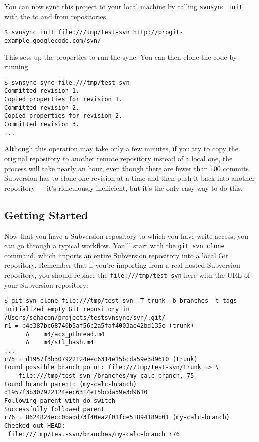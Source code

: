 \documentclass[a4paper]{book}
\begin{document}
You can now sync this project to your local machine by calling \texttt{svnsync init} with the to and from repositories.

\begin{shaded}\begin{verbatim}
$ svnsync init file:///tmp/test-svn http://progit-example.googlecode.com/svn/
\end{verbatim}\end{shaded}

This sets up the properties to run the sync. You can then clone the code by running

\begin{shaded}\begin{verbatim}
$ svnsync sync file:///tmp/test-svn
Committed revision 1.
Copied properties for revision 1.
Committed revision 2.
Copied properties for revision 2.
Committed revision 3.
...
\end{verbatim}\end{shaded}

Although this operation may take only a few minutes, if you try to copy the original repository to another remote repository instead of a local one, the process will take nearly an hour, even though there are fewer than 100 commits. Subversion has to clone one revision at a time and then push it back into another repository --- it's ridiculously inefficient, but it's the only easy way to do this.

\subsection{Getting Started}\label{getting-started-1}

Now that you have a Subversion repository to which you have write access, you can go through a typical workflow. You'll start with the \texttt{git svn clone} command, which imports an entire Subversion repository into a local Git repository. Remember that if you're importing from a real hosted Subversion repository, you should replace the \texttt{file:///tmp/test-svn} here with the URL of your Subversion repository:

\begin{shaded}\begin{verbatim}
$ git svn clone file:///tmp/test-svn -T trunk -b branches -t tags
Initialized empty Git repository in /Users/schacon/projects/testsvnsync/svn/.git/
r1 = b4e387bc68740b5af56c2a5faf4003ae42bd135c (trunk)
      A    m4/acx_pthread.m4
      A    m4/stl_hash.m4
...
r75 = d1957f3b307922124eec6314e15bcda59e3d9610 (trunk)
Found possible branch point: file:///tmp/test-svn/trunk => \
    file:///tmp/test-svn /branches/my-calc-branch, 75
Found branch parent: (my-calc-branch) d1957f3b307922124eec6314e15bcda59e3d9610
Following parent with do_switch
Successfully followed parent
r76 = 8624824ecc0badd73f40ea2f01fce51894189b01 (my-calc-branch)
Checked out HEAD:
 file:///tmp/test-svn/branches/my-calc-branch r76
\end{verbatim}\end{shaded}
\end{document}
